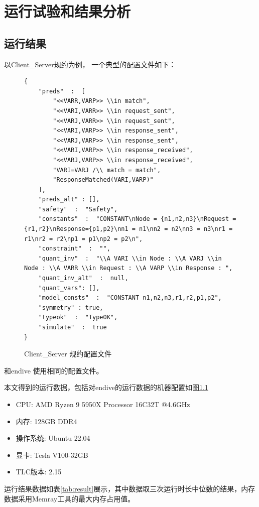 \chapter{运行试验和结果分析}\label{chap:run-analysis}

\section{运行结果}

以{Client\_Server}规约为例， 一个典型的配置文件如下：
\begin{figure}[htb]
    \centering
\begin{lstlisting}[]
{
    "preds"  :  [
        "<<VARR,VARP>> \\in match",
        "<<VARI,VARR>> \\in request_sent",
        "<<VARJ,VARR>> \\in request_sent",
        "<<VARI,VARP>> \\in response_sent",
        "<<VARJ,VARP>> \\in response_sent",
        "<<VARI,VARP>> \\in response_received",
        "<<VARJ,VARP>> \\in response_received",
        "VARI=VARJ /\\ match = match",
        "ResponseMatched(VARI,VARP)"
    ],
    "preds_alt" : [],
    "safety"  :  "Safety",
    "constants"  :  "CONSTANT\nNode = {n1,n2,n3}\nRequest = {r1,r2}\nResponse={p1,p2}\nn1 = n1\nn2 = n2\nn3 = n3\nr1 = r1\nr2 = r2\np1 = p1\np2 = p2\n",
    "constraint"  :  "",
    "quant_inv"  :  "\\A VARI \\in Node : \\A VARJ \\in Node : \\A VARR \\in Request : \\A VARP \\in Response : ",
    "quant_inv_alt"  :  null,
    "quant_vars": [],
    "model_consts"  :  "CONSTANT n1,n2,n3,r1,r2,p1,p2",
    "symmetry" : true,
    "typeok"  :  "TypeOK",
    "simulate"  :  true      
}
\end{lstlisting}
\caption{Client\_Server 规约配置文件}
\label{lst:config}
\end{figure}

\rltla 和endive 使用相同的配置文件。

本文得到的运行数据，包括对endive的运行数据的机器配置如图\ref{lst:config}
\begin{itemize}
    \item CPU: AMD Ryzen 9 5950X Processor 16C32T @4.6GHz
    \item 内存: 128GB DDR4 
    \item 操作系统: Ubuntu 22.04
    \item 显卡: Tesla V100-32GB
    \item TLC版本: 2.15
\end{itemize}
运行结果数据如表\ref{tab:result}展示，其中数据取三次运行时长中位数的结果，内存数据采用Memray工具的最大内存占用值。

